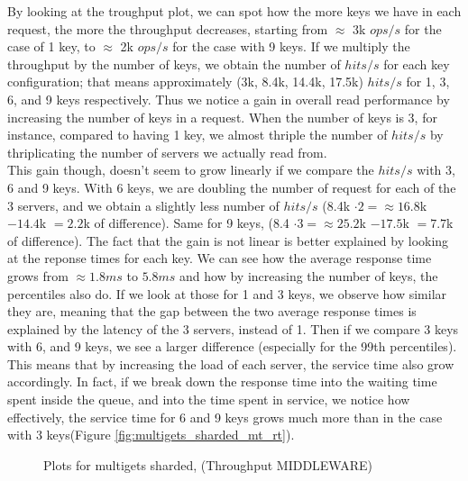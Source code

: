\documentclass[11pt,a4paper]{article}
\begin{document}
By looking at the troughput plot, we can spot how the more keys we have in each request, the more the throughput decreases, starting from $\approx$ 3k $ops/s$ for the case of 1 key, to $\approx$ 2k $ops/s$ for the case with 9 keys. If we multiply the throughput by the number of keys, we obtain the number of $hits/s$ for each key configuration; that means approximately (3k, 8.4k, 14.4k, 17.5k) $hits/s$ for 1, 3, 6, and 9 keys respectively.
Thus we notice a gain in overall read performance by increasing the number of keys in a request.
When the number of keys is 3, for instance, compared to having 1 key, we almost thriple the number of $hits/s$ by thriplicating the number of servers we actually read from.\\
This gain though, doesn't seem to grow linearly if we compare the $hits/s$ with 3, 6 and 9 keys. With 6 keys, we are doubling the number of request for each of the 3 servers, and we obtain a slightly less number of $hits/s$ (8.4k $\cdot 2 = \approx 16.8$k $- 14.4$k $=2.2$k of difference). Same for 9 keys, (8.4 $\cdot 3 = \approx 25.2$k $-17.5$k $=7.7$k of difference).
The fact that the gain is not linear is better explained by looking at the reponse times for each key.
We can see how the average response time grows from $\approx 1.8 ms$ to $5.8 ms$ and how by increasing the number of keys, the percentiles also do. If we look at those for 1 and 3 keys, we observe how similar they are, meaning that the gap between the two average response times is explained by the latency of the 3 servers, instead of 1. Then if we compare 3 keys with 6, and 9 keys, we see a larger difference (especially for the 99th percentiles). This means that by increasing the load of each server, the service time also grow accordingly. In fact, if we break down the response time into the waiting time spent inside the queue, and into the time spent in service, we notice how effectively, the service time for 6 and 9 keys grows much more than in the case with 3 keys(Figure \ref{fig:multigets_sharded_mt_rt}).


\begin{figure}[!h]
  \centering
    \caption{Plots for multigets sharded, (Throughput MIDDLEWARE)}
  \label{fig:multigets_sharded_mw_tp}
\end{figure}
\end{document}
